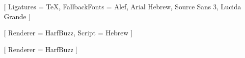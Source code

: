 


\usepackage{iftex}
\RequireXeTeX

\usepackage{fontspec}

\setmainfont{Georgia}[
  Ligatures     = TeX,
  FallbackFonts = {Alef, Arial Hebrew, Source Sans 3, Lucida Grande}
]

\newfontfamily{}[
  Renderer = HarfBuzz,
  Script   = Hebrew
]

\newfontfamily{}[
  Renderer = HarfBuzz
]

\usepackage{bidi}

\usepackage[
  Hebrew,
  IPAExtensions,
  SpacingModifierLetters,
  PhoneticExtensions
]{ucharclasses}

              {\hebrewfont}{\normalfont}
   {\ipafont}{\normalfont\rmfamily}

